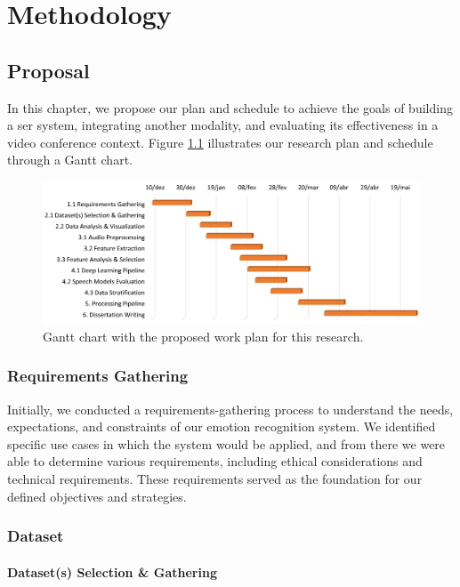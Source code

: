 \chapter{Methodology}
\label{chapter:prop}

\section{Proposal}

In this chapter, we propose our plan and schedule to achieve the goals of building a \ac{ser} system, integrating another modality, and evaluating its effectiveness in a video conference context. Figure \ref{fig:gantt} illustrates our research plan and schedule through a Gantt chart.

\begin{figure}[h]
	\centering
	\includegraphics[width=\linewidth]{figs/3_methodology/gantt_chart.png}
	\caption{Gantt chart with the proposed work plan for this research.}
	\label{fig:gantt}
\end{figure}

\subsection{Requirements Gathering}

Initially, we conducted a requirements-gathering process to understand the needs, expectations, and constraints of our emotion recognition system. We identified specific use cases in which the system would be applied, and from there we were able to determine various requirements, including ethical considerations and technical requirements. These requirements served as the foundation for our defined objectives and strategies.


\subsection{Dataset}

\subsubsection{Dataset(s) Selection \& Gathering}

